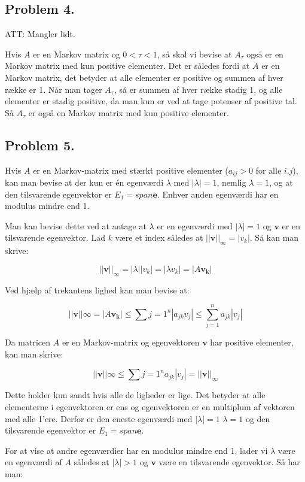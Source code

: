 \subsection*{Problem 4.}
ATT: Mangler lidt.


Hvis $A$ er en Markov matrix og $0 < \tau < 1$, så skal vi bevise at $A_{\tau}$ også er en Markov matrix med kun positive elementer. Det er således fordi at $A$ er en Markov matrix, det betyder at alle elementer er positive og summen af hver række er 1. Når man tager $A_{\tau}$, så er summen af hver række stadig 1, og alle elementer er stadig positive, da man kun er ved at tage potenser af positive tal. Så $A_{\tau}$ er også en Markov matrix med kun positive elementer.

\subsection*{Problem 5.}

Hvis $A$ er en Markov-matrix med stærkt positive elementer ($a_{ij} > 0$ for alle $i$,$j$), kan man bevise at der kun er én egenværdi $\lambda$ med $|\lambda| = 1$, nemlig $\lambda = 1$, og at den tilsvarende egenvektor er $E_1 = span {\mathbf{e}}$. Enhver anden egenværdi har en modulus mindre end 1.

Man kan bevise dette ved at antage at $\lambda$ er en egenværdi med $|\lambda| = 1$ og $\mathbf{v}$ er en tilsvarende egenvektor. Lad $k$ være et index således at $||\mathbf{v}||_\infty = |v_k|$. Så kan man skrive:

$$||\mathbf{v}||_\infty = |\lambda ||v_k| = |\lambda v_k| = |A\mathbf{v_k}|$$

Ved hjælp af trekantens lighed kan man bevise at:

$$||\mathbf{v}||\infty = |A\mathbf{v_k}| \leq \sum{j=1}^n |a_{jk} v_j| \leq \sum_{j=1}^n a_{jk} |v_j|$$

Da matricen $A$ er en Markov-matrix og egenvektoren $\mathbf{v}$ har positive elementer, kan man skrive:

$$||\mathbf{v}||\infty \leq \sum{j=1}^n a_{jk} |v_j| = ||\mathbf{v}||_\infty$$

Dette holder kun sandt hvis alle de ligheder er lige. Det betyder at alle elementerne i egenvektoren er ens og egenvektoren er en multiplum af vektoren med alle 1'ere. Derfor er den eneste egenværdi med $|\lambda| = 1$ $\lambda = 1$ og den tilsvarende egenvektor er $E_1 = span {\mathbf{e}}$.

For at vise at andre egenværdier har en modulus mindre end 1, lader vi $\lambda$ være en egenværdi af $A$ således at $|\lambda| > 1$ og $\mathbf{v}$ være en tilsvarende egenvektor. Så har man:

